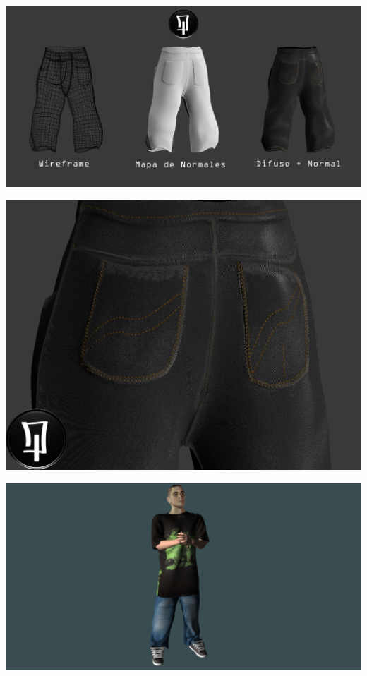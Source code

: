 \documentclass{article}
\begin{document}
  \includegraphics[width=\textwidth]{6.png}

  \includegraphics[width=\textwidth]{7.png}
  
  \includegraphics[width=\textwidth]{16.png}
  
\end{document}
